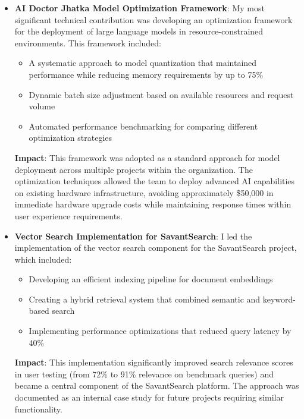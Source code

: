 \documentclass[12pt,a4paper]{article}
\begin{document}
\begin{itemize}
    \item \textbf{AI Doctor Jhatka Model Optimization Framework}: My most significant technical contribution was developing an optimization framework for the deployment of large language models in resource-constrained environments. This framework included:
    \begin{itemize}
        \item A systematic approach to model quantization that maintained performance while reducing memory requirements by up to 75\%
        \item Dynamic batch size adjustment based on available resources and request volume
        \item Automated performance benchmarking for comparing different optimization strategies
    \end{itemize}
    \textbf{Impact}: This framework was adopted as a standard approach for model deployment across multiple projects within the organization. The optimization techniques allowed the team to deploy advanced AI capabilities on existing hardware infrastructure, avoiding approximately \$50,000 in immediate hardware upgrade costs while maintaining response times within user experience requirements.
    
    \item \textbf{Vector Search Implementation for SavantSearch}: I led the implementation of the vector search component for the SavantSearch project, which included:
    \begin{itemize}
        \item Developing an efficient indexing pipeline for document embeddings
        \item Creating a hybrid retrieval system that combined semantic and keyword-based search
        \item Implementing performance optimizations that reduced query latency by 40\%
    \end{itemize}
    \textbf{Impact}: This implementation significantly improved search relevance scores in user testing (from 72\% to 91\% relevance on benchmark queries) and became a central component of the SavantSearch platform. The approach was documented as an internal case study for future projects requiring similar functionality.
    

\end{itemize}
\end{document}
